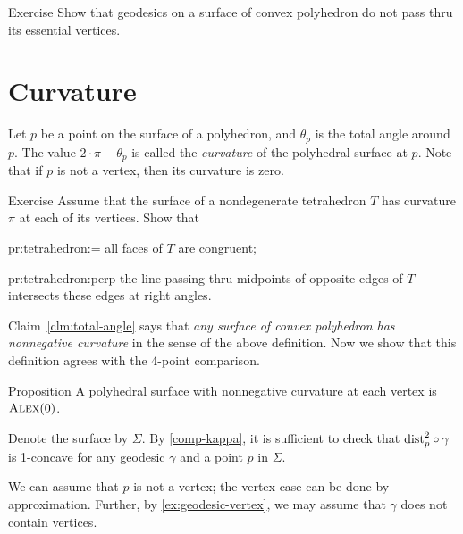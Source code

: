\begin{thm}{Exercise}\label{ex:geodesic-vertex}
Show that geodesics on a surface of convex polyhedron do not pass thru its essential vertices.
\end{thm}

\section{Curvature}

Let $p$ be a point on the surface of a polyhedron, and $\theta_p$ is the total angle around $p$.
The value $2\cdot \pi -\theta_p$ is called the \emph{curvature} of the polyhedral surface at $p$.
Note that if $p$ is not a vertex, then its curvature is zero.

\begin{thm}{Exercise}\label{pr:tetrahedron} 
Assume that the surface of a nondegenerate tetrahedron $T$ has curvature $\pi$ at each of its vertices.
Show that 

\begin{subthm}{pr:tetrahedron:=}
all faces of $T$ are congruent; 
\end{subthm}

\begin{subthm}{pr:tetrahedron:perp} the line passing thru midpoints of opposite edges of $T$ intersects these edges at right angles.
\end{subthm}
 
\end{thm}

Claim~\ref{clm:total-angle} says that \textit{any surface of convex polyhedron has nonnegative curvature} in the sense of the above definition.
Now we show that this definition agrees with the 4-point comparison.

\begin{thm}{Proposition}\label{prop:poly-CBB}
A polyhedral surface with nonnegative curvature at each vertex is $\textsc{Alex}(0)$.
\end{thm}

Denote the surface by $\Sigma$.
By \ref{comp-kappa}, it is sufficient to check that 
$\mathrm{dist}_p^2\circ\gamma$ is 1-concave for any geodesic $\gamma$ and a point $p$ in $\Sigma$.

We can assume that $p$ is not a vertex;
the vertex case can be done by approximation.
Further, by \ref{ex:geodesic-vertex}, we may assume that $\gamma$ does not contain vertices.

